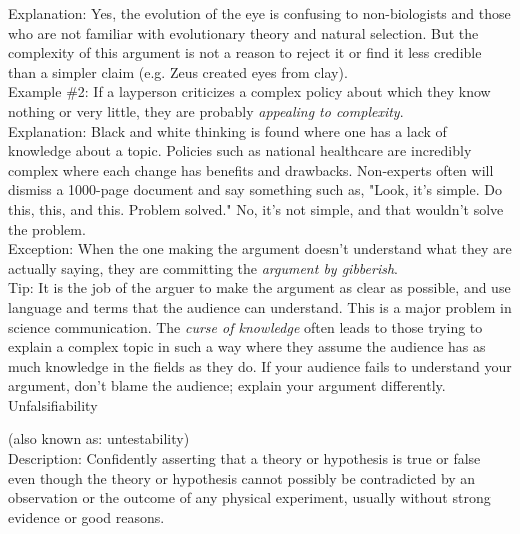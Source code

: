 \documentclass[a4paper,12pt,single,pdftex]{scrartcl}
\begin{document}
    
      Explanation: Yes, the evolution of the eye is confusing to non-biologists and those who are not familiar with evolutionary theory and natural selection. But the complexity of this argument is not a reason to reject it or find it less credible than a simpler claim (e.g. Zeus created eyes from clay).
    \\

    
      Example \#2: If a layperson criticizes a complex policy about which they know nothing or very little, they are probably {\it appealing to complexity}.
    \\

    
      Explanation: Black and white thinking is found where one has a lack of knowledge about a topic. Policies such as national healthcare are incredibly complex where each change has benefits and drawbacks. Non-experts often will dismiss a 1000-page document and say something such as, "Look, it's simple. Do this, this, and this. Problem solved." No, it's not simple, and that wouldn't solve the problem.
    \\

    
      Exception: When the one making the argument doesn't understand what they are actually saying, they are committing the {\it argument by gibberish}.
    \\

    
      Tip: It is the job of the arguer to make the argument as clear as possible, and use language and terms that the audience can understand. This is a major problem in science communication. The {\it curse of knowledge} often leads to those trying to explain a complex topic in such a way where they assume the audience has as much knowledge in the fields as they do. If your audience fails to understand your argument, don't blame the audience;  explain your argument differently.
    \\

  

Unfalsifiability
    
      (also known as: untestability)
    \\

  
    
      
        Description: Confidently asserting that a theory or hypothesis is true or false even though the theory or hypothesis cannot possibly be contradicted by an observation or the outcome of any physical experiment, usually without strong evidence or good reasons.
      \\
\end{document}
